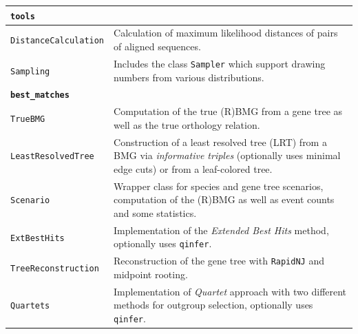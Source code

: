 \documentclass[hidelinks,11pt]{article}
\begin{document}
{\begin{longtable}{| p{4.0cm} | p{10cm} |}
	\hline
	\multicolumn{2}{|l|}{\textbf{\texttt{tools}}}\\
	\hline
	\texttt{DistanceCalculation} &
	Calculation of maximum likelihood distances of pairs of aligned sequences. \\
  \texttt{Sampling} &
  Includes the class \texttt{Sampler} which support drawing numbers from 
  various distributions. \\
	\hline
	\multicolumn{2}{|l|}{\textbf{\texttt{best\_matches}}}\\
	\hline
	\texttt{TrueBMG} &
	Computation of the true (R)BMG from a gene tree as well as the true orthology relation. \\
	\texttt{LeastResolvedTree} &
	Construction of a least resolved tree (LRT) from a BMG via \emph{informative triples} (optionally uses minimal edge cuts) or from a leaf-colored tree. \\
	\texttt{Scenario} &
	Wrapper class for species and gene tree scenarios, computation of the (R)BMG as well as event counts and some statistics. \\
	\texttt{ExtBestHits} &
	Implementation of the \emph{Extended Best Hits} method, optionally uses \texttt{qinfer}. \\
	\texttt{TreeReconstruction} &
	Reconstruction of the gene tree with \texttt{RapidNJ} \citep{simonsen2008} and midpoint rooting. \\
	\texttt{Quartets} &
	Implementation of \emph{Quartet} approach with two different methods for outgroup selection, optionally uses \texttt{qinfer}. \\

\end{longtable}}
\end{document}
